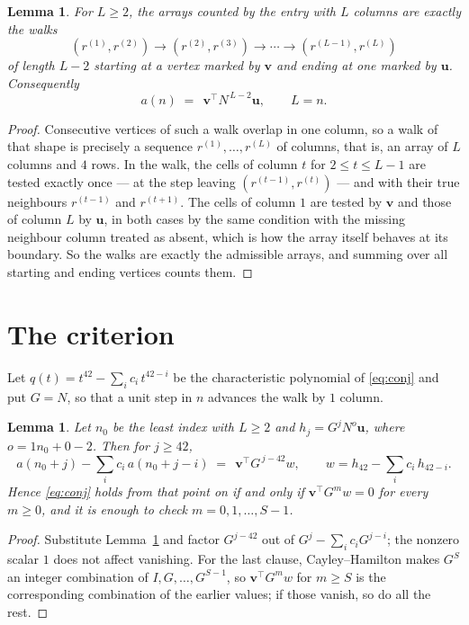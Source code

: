 \documentclass[11pt,a4paper]{article}
\theoremstyle{plain}
\newtheorem{lemma}[theorem]{Lemma}
\theoremstyle{definition}
\begin{document}
\begin{lemma}\label{lem:walk}
For $L\ge2$, the arrays counted by the entry with $L$ columns are exactly the walks
\[
(r^{(1)},r^{(2)})\to(r^{(2)},r^{(3)})\to\cdots\to(r^{(L-1)},r^{(L)})
\]
of length $L-2$ starting at a vertex marked by $\mathbf{v}$ and ending at one marked by
$\mathbf{u}$. Consequently
\[
a(n)\;=\;\,\mathbf{v}^{\!\top}N^{\,L-2}\mathbf{u},\qquad L=n .
\]
\end{lemma}

\begin{proof}
Consecutive vertices of such a walk overlap in one column, so a walk of that shape is
precisely a sequence $r^{(1)},\dots,r^{(L)}$ of columns, that is, an array of $L$ columns
and $4$ rows. In the walk, the cells of column $t$ for $2\le t\le L-1$ are tested
exactly once --- at the step leaving $(r^{(t-1)},r^{(t)})$ --- and with their true
neighbours $r^{(t-1)}$ and $r^{(t+1)}$. The cells of column $1$ are tested by
$\mathbf{v}$ and those of column $L$ by $\mathbf{u}$, in both cases by the same condition
with the missing neighbour column treated as absent, which is how the array itself behaves at
its boundary. So the walks are exactly the admissible arrays, and summing over all starting
and ending vertices counts them.
\end{proof}

\section{The criterion}

Let $q(t)=t^{42}-\sum_i c_i\,t^{42-i}$ be the characteristic polynomial of
\eqref{eq:conj} and put $G=N$, so that a unit step in $n$ advances the walk by
$1$ column.

\begin{lemma}\label{lem:crit}
Let $n_0$ be the least index with $L\ge2$ and $h_j=G^{j}N^{o}\mathbf{u}$, where
$o=1n_0+0-2$. Then for $j\ge42$,
\[
a(n_0+j)-\sum_i c_i\,a(n_0+j-i)\;=\;\,\mathbf{v}^{\!\top}G^{\,j-42}w,
\qquad w=h_{42}-\sum_i c_i\,h_{42-i} .
\]
Hence \eqref{eq:conj} holds from that point on if and only if
$\mathbf{v}^{\!\top}G^{m}w=0$ for every $m\ge0$, and it is enough to check
$m=0,1,\dots,S-1$.
\end{lemma}

\begin{proof}
Substitute Lemma~\ref{lem:walk} and factor $G^{j-42}$ out of
$G^{j}-\sum_ic_iG^{j-i}$; the nonzero scalar $1$ does not affect
vanishing. For the last clause, Cayley--Hamilton makes $G^{S}$ an integer combination of
$I,G,\dots,G^{S-1}$, so $\mathbf{v}^{\!\top}G^{m}w$ for $m\ge S$ is the corresponding
combination of the earlier values; if those vanish, so do all the rest.
\end{proof}
\end{document}
